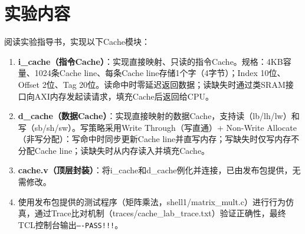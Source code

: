 \section{实验内容}

阅读实验指导书，实现以下Cache模块：

\begin{enumerate}[(1)]
    \item \textbf{i\_cache（指令Cache）}：实现直接映射、只读的指令Cache。规格：4KB容量、1024条Cache line、每条Cache line存储1个字（4字节）；Index 10位、Offset 2位、Tag 20位。读命中时零延迟返回数据；读缺失时通过类SRAM接口向AXI内存发起读请求，填充Cache后返回给CPU。
    \item \textbf{d\_cache（数据Cache）}：实现直接映射的数据Cache，支持读（lb/lh/lw）和写（sb/sh/sw）。写策略采用Write Through（写直通）+ Non-Write Allocate（非写分配）：写命中时同步更新Cache line并直写内存；写缺失时仅写内存不分配Cache line；读缺失时从内存读入并填充Cache。
    \item \textbf{cache.v（顶层封装）}：将i\_cache和d\_cache例化并连接，已由发布包提供，无需修改。
    \item 使用发布包提供的测试程序（矩阵乘法，shell1/matrix\_mult.c）进行行为仿真，通过Trace比对机制（traces/cache\_lab\_trace.txt）验证正确性，最终TCL控制台输出\texttt{----PASS!!!}。
\end{enumerate}
